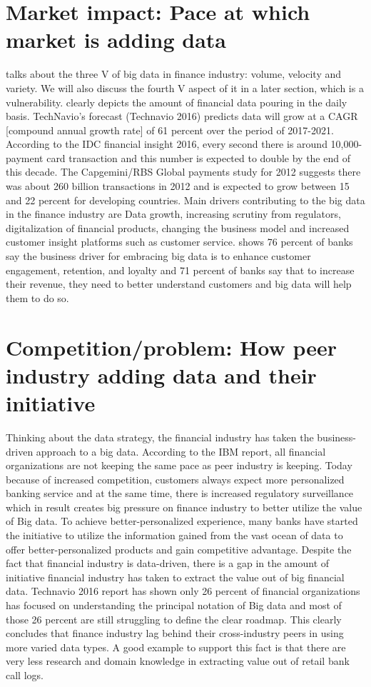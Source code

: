 \documentclass[sigconf]{acmart}
\begin{document}
\section{Market impact: Pace at which market is adding data}

\cite{Ref2}  talks about the three V of big data in finance industry: volume, velocity and variety. We will also discuss the fourth V aspect of it in a later section, which is a vulnerability. \cite{Ref3} clearly depicts the amount of financial data pouring in the daily basis. TechNavio’s forecast (Technavio 2016) predicts data will grow at a CAGR [compound annual growth rate] of 61 percent over the period of 2017-2021. According to the IDC financial insight 2016, every second there is around 10,000-payment card transaction and this number is expected to double by the end of this decade. The Capgemini/RBS Global payments study for 2012 suggests there was about 260 billion transactions in 2012 and is expected to grow between 15 and 22 percent for developing countries. Main drivers contributing to the big data in the finance industry are Data growth, increasing scrutiny from regulators, digitalization of financial products, changing the business model and increased customer insight platforms such as customer service. \cite{Ref2} shows 76 percent of banks say the business driver for embracing big data is to enhance customer engagement, retention, and loyalty and 71 percent of banks say that to increase their revenue, they need to better understand customers and big data will help them to do so. 

\section{Competition/problem: How peer industry adding data and their initiative  }

Thinking about the data strategy, the financial industry has taken the business-driven approach to a big data. According to the IBM report, all financial organizations are not keeping the same pace as peer industry is keeping. Today because of increased competition, customers always expect more personalized banking service and at the same time, there is increased regulatory surveillance which in result creates big pressure on finance industry to better utilize the value of Big data. To achieve better-personalized experience, many banks have started the initiative to utilize the information gained from the vast ocean of data to offer better-personalized products and gain competitive advantage.  Despite the fact that financial industry is data-driven, there is a gap in the amount of initiative financial industry has taken to extract the value out of big financial data.  Technavio 2016 report has shown only 26 percent of financial organizations has focused on understanding the principal notation of Big data and most of those 26 percent are still struggling to define the clear roadmap. This clearly concludes that finance industry lag behind their cross-industry peers in using more varied data types. A good example to support this fact is that there are very less research and domain knowledge in extracting value out of retail bank call logs. 
\end{document}
